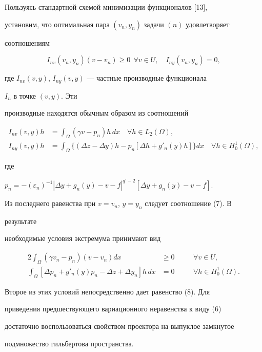 \begin{pf} 


Пользуясь стандартной схемой минимизации функционалов [13], 


установим, что оптимальная пара $(v_n,y_n)$ задачи $(n)$ удовлетворяет 


соотношениям 


$$


I_{nv}(v_n,y_n)(v-v_n)\ge 0\ \ \forall v\in U, \quad 


I_{ny}(v_n,y_n)=0, 


$$


где $I_{nv}(v,y)$, $I_{ny}(v,y)$ --- частные производные функционала 


$I_n$ в точке $(v,y)$. Эти 


производные находятся обычным образом из соотношений 


\begin{align*} %


I_{nv}(v,y)h&=\int_\Omega(\gamma v-p_n)h\,dx \quad 


\forall h\in L_2(\Omega), \\ 


I_{ny}(v,y)h&=\int_\Omega\{(\Delta z-\Delta y)h-p_n 


[\Delta h+g'_n(y)h]\}dx \quad \forall h\in H^1_0(\Omega), 


\end{align*} 


где 


$p_n=-(\varepsilon_n)^{-1}|\Delta y+g_n(y)-v-f|^{q'-2} 


[\Delta y+g_n(y)-v-f]$. 


Из последнего равенства при $v=v_n$, $y=y_n$ следует соотношение (7). В 


результате 


необходимые условия экстремума принимают вид 


\begin{alignat*}{2} 


\int_\Omega(\gamma v_n-p_n)(v-v_n)dx&\ge0 &\quad 


&\forall v\in U, \\ 


\int_\Omega[\Delta p_n+g'_n(y)p_n-\Delta z+\Delta y_n]h\,dx 


&=0 &\quad &\forall h\in H^1_0(\Omega). 


\end{alignat*} 


Второе из этих условий непосредственно дает равенство (8). Для 


приведения предшествующего вариационного неравенства к виду (6) 


достаточно воспользоваться свойством проектора на выпуклое замкнутое 


подмножество гильбертова пространства. 


\end{pf} 


